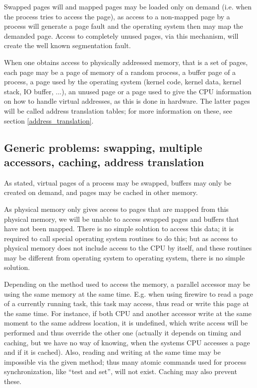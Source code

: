 Swapped pages will and mapped pages may be loaded only on demand (i.e. when the
process tries to access the page), as access to a non-mapped page by a process
will generate a page fault and the operating system then may map the demanded
page.  Access to completely unused pages, via this mechanism, will create the
well known segmentation fault.

When one obtains access to physically addressed memory, that is a set of pages,
each page may be a page of memory of a random process, a buffer page of a
process, a page used by the operating system (kernel code, kernel data, kernel
stack, IO buffer, ...), an unused page or a page used to give the CPU
information on how to handle virtual addresses, as this is done in hardware.
The latter pages will be called address translation tables; for more information
on these, see section \ref{address_translation}.

\subsection{Generic problems: swapping, multiple accessors, caching, address
translation}

As stated, virtual pages of a process may be swapped, buffers may only be
created on demand, and pages may be cached in other memory.

As physical memory only gives access to pages that are mapped from this
physical memory, we will be unable to access swapped pages and buffers that
have not been mapped. There is no simple solution to access this data; it is
required to call special operating system routines to do this; but as access to
physical memory does not include access to the CPU by itself, and these
routines may be different from operating system to operating system, there is
no simple solution.

Depending on the method used to access the memory, a parallel accessor may be
using the same memory at the same time. E.g. when using firewire to read a page
of a currently running task, this task may access, thus read or write this page
at the same time. For instance, if both CPU and another accessor write at the
same moment to the same address location, it is undefined, which write access
will be performed and thus override the other one (actually it depends on timing
and caching, but we have no way of knowing, when the systems CPU accesses a page
and if it is cached). Also, reading and writing at the same time may be
impossible via the given method; thus many atomic commands used for process
synchronization, like ``test and set'', will not exist.  Caching may also
prevent these.

